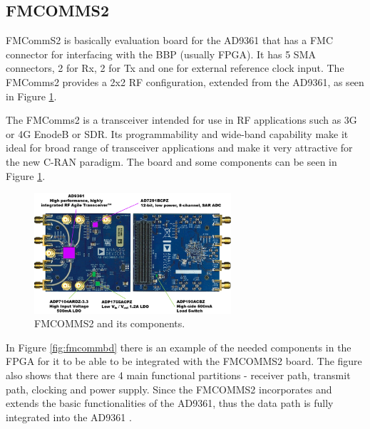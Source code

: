 \subsection{FMCOMMS2}
\label{trans:fmcomms2}

FMCommS2 is basically evaluation board for the AD9361 that has a FMC connector
for interfacing with the BBP (usually FPGA). It has 5 SMA connectors, 2 for Rx,
2 for Tx and one for external reference clock input. The FMComms2 provides a 2x2
RF configuration, extended from the AD9361, as seen in Figure \ref{fig:fmcomm}.

The FMComms2 is a transceiver intended for use in RF applications such  as 3G or
4G EnodeB or SDR. Its programmability and wide-band capability make it ideal for
broad range of transceiver applications and make it very attractive for the new
C-RAN paradigm. The board and some components can be seen in Figure
\ref{fig:fmcomm}.

\begin{figure}[htbp]
    \centering
    \includegraphics[width=0.65\textwidth]{./figures/fmcomms2_pic}
    \caption{ FMCOMMS2 and its components.
    \label{fig:fmcomm}}
\end{figure}


In Figure \ref{fig:fmcommbd} there is an example of the needed components in the
FPGA for it to be able to be integrated with the FMCOMMS2 board. The figure also
shows that there are 4 main functional partitions - receiver path, transmit
path, clocking and power supply. Since the FMCOMMS2 incorporates and extends the
basic functionalities of the AD9361, thus the data path is fully integrated into
the AD9361 \cite{web:fmcomms2wiki}.

